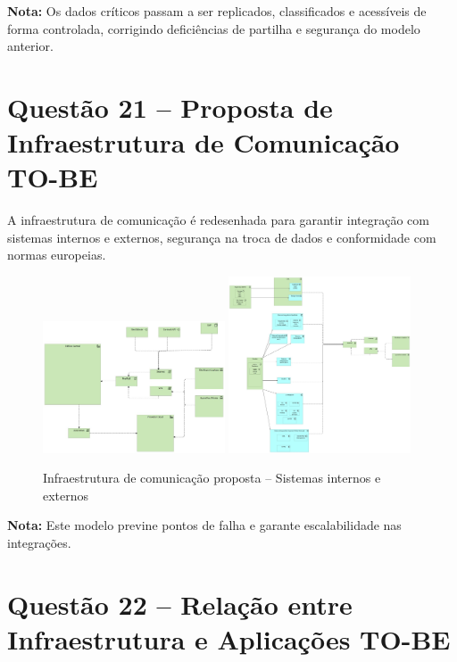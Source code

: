 \documentclass[12pt,a4paper,final]{article}
\begin{document}
    \textbf{Nota:} Os dados críticos passam a ser replicados, classificados e acessíveis de forma controlada, corrigindo deficiências de partilha e segurança do modelo anterior.

    \section*{Questão 21 – Proposta de Infraestrutura de Comunicação TO-BE}

    A infraestrutura de comunicação é redesenhada para garantir integração com sistemas internos e externos, segurança na troca de dados e conformidade com normas europeias.

    \begin{figure}[H]
        \centering
        \includegraphics[width=0.48\textwidth]{Q21 - Communication Infrastructure Proposal - 3rd Party Systems.jpg}
        \includegraphics[width=0.48\textwidth]{Q21 - Communication Infrastructure Proposal - CML Systems.jpg}
        \caption{Infraestrutura de comunicação proposta – Sistemas internos e externos}
        \label{fig:q21-comms-tobe}
    \end{figure}

    \textbf{Nota:} Este modelo previne pontos de falha e garante escalabilidade nas integrações.

    \section*{Questão 22 – Relação entre Infraestrutura e Aplicações TO-BE}
\end{document}
